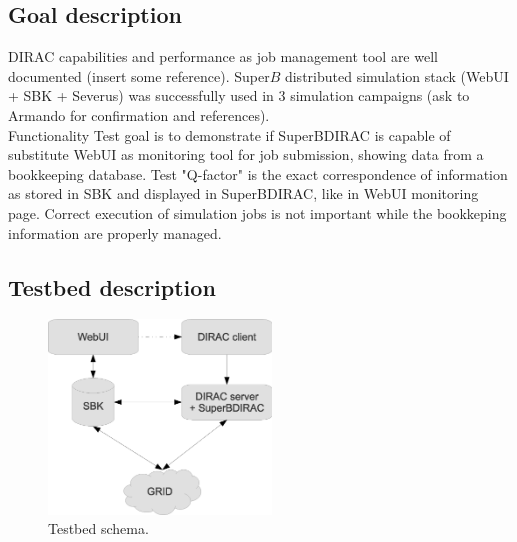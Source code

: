 \documentclass[a4paper]{jpconf}
\begin{document}
\subsection{Goal description}
DIRAC capabilities and performance as job management tool are well documented (insert some reference). Super$B$ distributed simulation stack (WebUI + SBK + Severus) was successfully used in 3 simulation campaigns (ask to Armando for confirmation and references).\\
Functionality Test goal is to demonstrate if SuperBDIRAC is capable of substitute WebUI as monitoring tool for job submission, showing data from a bookkeeping database. Test "Q-factor" is the exact correspondence of information as stored in SBK and displayed in SuperBDIRAC, like in WebUI monitoring page. Correct execution of simulation jobs is not important while the bookkeping information are properly managed.

\subsection{Testbed description}

\begin{figure}[h]
\includegraphics[width=14pc]{img/testbed.eps}\hspace{2pc}%
\begin{minipage}[b]{14pc}\caption{\label{label}Testbed schema.}
\end{minipage}
\end{figure}
\end{document}
